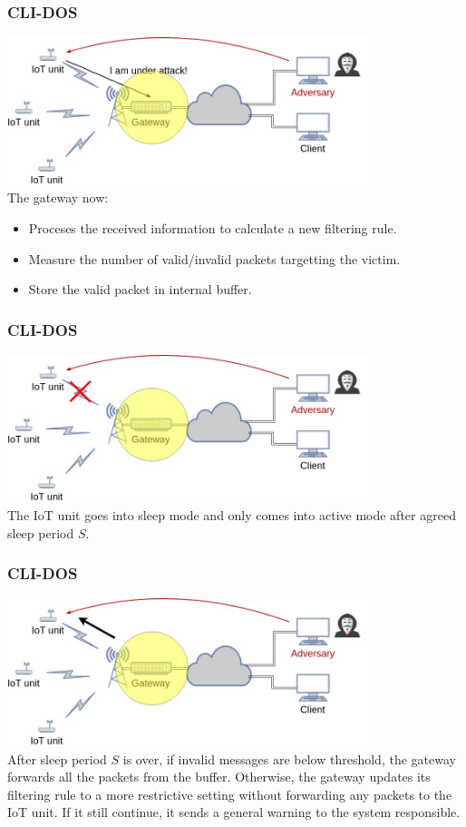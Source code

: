 \documentclass{beamer}
\begin{document}
\begin{frame}
\frametitle{CLI-DOS}
\includegraphics[height=4.3cm]{gambar/proc.jpg}
\\
The gateway now: 
\begin{itemize}
\item Proceses the received information to calculate a new filtering rule. 
\item Measure the number of valid/invalid packets targetting the victim.
\item Store the valid packet in internal buffer.
\end{itemize}
\end{frame}

\begin{frame}
\frametitle{CLI-DOS}
\includegraphics[height=4.3cm]{gambar/off.jpg}
\\
The IoT unit goes into sleep mode and only comes into active mode after agreed sleep period $S$.
\end{frame}

\begin{frame}
\frametitle{CLI-DOS}
\includegraphics[height=4.3cm]{gambar/back.jpg}
\\
After sleep period $S$ is over, if invalid messages are below threshold, the gateway forwards all the packets from the buffer. Otherwise, the gateway updates its filtering rule to a more restrictive setting without forwarding any packets to the IoT unit. If it still continue, it sends a general warning to the system responsible.
\end{frame}
\end{document}

